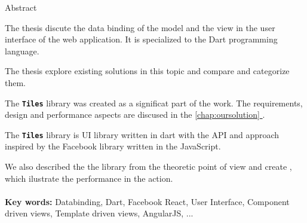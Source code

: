 \documentclass[oneside, 12pt]{book}
\def\mfkeywordsen{Databinding, Dart, Facebook React, User Interface, Component driven views, Template driven views, AngularJS, ... }
\newcommand*{\fullref}[1]{\hyperref[{#1}]{\autoref*{#1} \nameref*{#1}}}
\newcommand{\tiles}[0]{\textbf{\texttt{Tiles}} }
\newcommand{\facebook}[0]{Facebook }
\begin{document}
\noindent
\begin{center}
\begin{minipage}{1\textwidth}
\centerline{\large Abstract}
\setlength{\parskip}{0.2cm}
The thesis discute the data binding of the model and the view in the user interface of the web application.
It is specialized to the Dart programming language. 

The thesis explore existing solutions in this topic and compare and categorize them.

The \tiles library was created as a significat part of the work. 
The requirements, design and performance aspects are discused in the \fullref{chap:oursolution}. 

The \tiles library is  UI library written in dart 
with the API and approach inspired by the \facebook {} library written in the JavaScript.

We also described the  the library from the theoretic point of view 
and create , which ilustrate the performance in the action.
\\ \\ 
{\bf Key words:} \mfkeywordsen
\end{minipage}
\end{center}
\eject %
\end{document}
